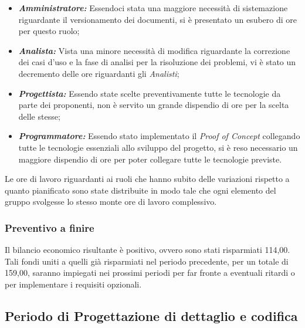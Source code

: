 \begin{itemize}
    \item \textbf{\textit{Amministratore:}} Essendoci stata una maggiore necessità di sistemazione riguardante il versionamento dei documenti, si è presentato un esubero di ore per questo ruolo;
    \item \textbf{\textit{Analista:}} Vista una minore necessità di modifica riguardante la correzione dei casi d'uso e la fase di analisi per la risoluzione dei problemi, vi è stato un decremento delle ore riguardanti gli \textit{Analisti};
    \item \textbf{\textit{Progettista:}} Essendo state scelte preventivamente tutte le tecnologie da parte dei proponenti, non è servito un grande dispendio di ore per la scelta delle stesse;
    \item \textbf{\textit{Programmatore:}} Essendo stato implementato il \textit{Proof of Concept} collegando tutte le tecnologie essenziali allo sviluppo del progetto, si è reso necessario un maggiore dispendio di ore per poter collegare tutte le tecnologie previste.
\end{itemize}

Le ore di lavoro riguardanti ai ruoli che hanno subito delle variazioni rispetto a quanto pianificato sono state distribuite in modo tale che ogni elemento del gruppo svolgesse lo stesso monte ore di lavoro complessivo.

\subsubsection{Preventivo a finire} Il bilancio economico risultante è positivo, ovvero sono stati risparmiati 114,00\EURdig. Tali fondi uniti a quelli già risparmiati nel periodo precedente, per un totale di 159,00\EurDig, saranno impiegati nei prossimi periodi per far fronte a eventuali ritardi o per implementare i requisiti opzionali.


\newpage
\subsection{Periodo di Progettazione di dettaglio e codifica}
